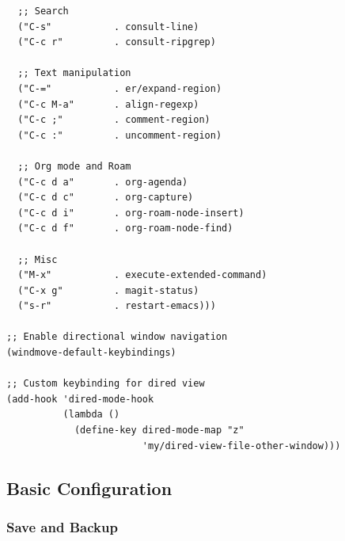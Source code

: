 \documentclass[11pt]{article}
\begin{document}
\begin{verbatim}
  ;; Search
  ("C-s"           . consult-line)
  ("C-c r"         . consult-ripgrep)

  ;; Text manipulation
  ("C-="           . er/expand-region)
  ("C-c M-a"       . align-regexp)
  ("C-c ;"         . comment-region)
  ("C-c :"         . uncomment-region)

  ;; Org mode and Roam
  ("C-c d a"       . org-agenda)
  ("C-c d c"       . org-capture)
  ("C-c d i"       . org-roam-node-insert)
  ("C-c d f"       . org-roam-node-find)

  ;; Misc
  ("M-x"           . execute-extended-command)
  ("C-x g"         . magit-status)
  ("s-r"           . restart-emacs)))

;; Enable directional window navigation
(windmove-default-keybindings)

;; Custom keybinding for dired view
(add-hook 'dired-mode-hook
          (lambda ()
            (define-key dired-mode-map "z"
                        'my/dired-view-file-other-window)))
\end{verbatim}
\subsection{Basic Configuration}
\label{sec:org3065273}
\subsubsection{Save and Backup}
\label{sec:org5a3402f}
\end{document}
